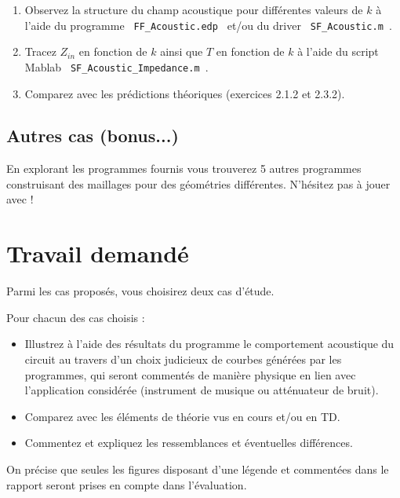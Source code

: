 \documentclass[11pt,a4paper]{article}
\begin{document}
\begin{enumerate}
\item
Observez la structure du champ acoustique pour différentes valeurs de $k$ à l'aide du programme \verb| FF_Acoustic.edp | et/ou du driver \verb| SF_Acoustic.m |.

\item 
Tracez $Z_{in}$ en fonction de $k$ ainsi que $T$ en fonction de $k$ à l'aide du script Mablab 
\verb| SF_Acoustic_Impedance.m |.

\item 
Comparez avec les prédictions théoriques (exercices 2.1.2 et 2.3.2).

\end{enumerate}


\subsection{Autres cas (bonus...)}

En explorant les programmes fournis vous trouverez 5 autres programmes construisant des maillages pour des géométries différentes. N'hésitez pas à jouer avec !


\section{Travail demandé}

Parmi les cas proposés, vous choisirez deux cas d'étude.

Pour chacun des cas choisis :
\begin{itemize}
\item Illustrez à l'aide des résultats du programme le comportement acoustique du circuit au travers d'un choix judicieux de courbes générées par les programmes, qui seront commentés de manière physique en lien avec l'application considérée (instrument de musique ou atténuateur de bruit).

\item Comparez avec les éléments de théorie vus en cours et/ou en TD.

\item Commentez et expliquez les ressemblances et éventuelles différences.
\end{itemize}

On précise que seules les figures disposant d'une légende et commentées dans le rapport seront prises en compte dans l'évaluation.
\end{document}
